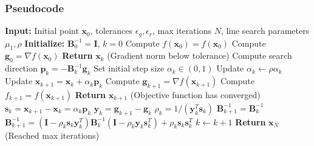 \documentclass[12pt]{article}
\begin{document}
\subsubsection{Pseudocode}
\begin{algorithm}[H]
    \caption{BFGS Quasi-Newton Algorithm}
    \begin{algorithmic}[1]
        \STATE \textbf{Input:} Initial point \( \mathbf{x}_0 \), tolerances \( \epsilon_g, \epsilon_r \), max iterations \( N \), line search parameters $\mu_1, \rho$
        \STATE \textbf{Initialize:} \( \mathbf{B}_0^{-1} = \mathbf{I} \), \( k = 0 \)
        \STATE Compute \( f(\mathbf{x}_0) = f(\mathbf{x}_0) \)
        \STATE Compute \( \mathbf{g}_0 = \nabla f(\mathbf{x}_0) \)
                \STATE \textbf{Return} \( \mathbf{x}_k \) \quad (Gradient norm below tolerance)
            \ENDIF
            \STATE Compute search direction \( \mathbf{p}_k = -\mathbf{B}_k^{-1} \mathbf{g}_k \)
            \STATE Set initial step size \( \alpha_k \in (0,1) \)
                \STATE Update \( \alpha_k \gets \rho \alpha_k \)  
            \ENDWHILE
            \STATE Update \( \mathbf{x}_{k+1} = \mathbf{x}_k + \alpha_k \mathbf{p}_k \)
            \STATE Compute \( \mathbf{g}_{k+1} = \nabla f(\mathbf{x}_{k+1}) \)
            \STATE Compute \( f_{k+1} = f(\mathbf{x}_{k+1}) \)
                \STATE \textbf{Return} \( \mathbf{x}_{k+1} \) \quad (Objective function has converged)
            \ENDIF
            \STATE \( \mathbf{s}_k = \mathbf{x}_{k+1} - \mathbf{x}_k = \alpha_k \mathbf{p}_k \)
            \STATE \( \mathbf{y}_k = \mathbf{g}_{k+1} - \mathbf{g}_k \)
            \STATE \( \rho_k = 1 / (\mathbf{y}_k^T \mathbf{s}_k) \)
                \STATE \( \mathbf{B}_{k+1}^{-1} = \mathbf{B}_k^{-1} \)
            \ELSE
                \STATE \( \mathbf{B}_{k+1}^{-1} = (\mathbf{I} - \rho_k \mathbf{s}_k \mathbf{y}_k^T) \mathbf{B}_k^{-1} (\mathbf{I} - \rho_k \mathbf{y}_k \mathbf{s}_k^T) + \rho_k \mathbf{s}_k \mathbf{s}_k^T \)
            \ENDIF
            \STATE \( k \gets k + 1 \)
        \ENDWHILE
        \STATE \textbf{Return} \( \mathbf{x}_N \) \quad (Reached max iterations)
    \end{algorithmic}
\end{algorithm}
\end{document}
